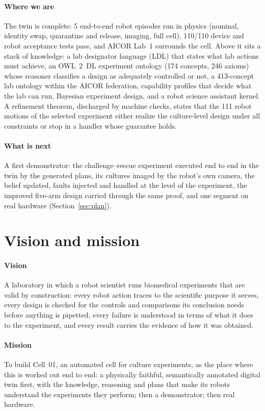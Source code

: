 \documentclass[10.5pt,a4paper]{article}
\begin{document}
\paragraph{Where we are} The twin is complete: 5 end-to-end robot episodes run in physics
(nominal, identity swap, quarantine and release, imaging, full cell), 110/110 device and robot
acceptance tests pass, and AICOR Lab~1 surrounds the cell. Above it sits a stack of knowledge: a lab designator language
(LDL) that states what lab actions must achieve, an OWL~2~DL experiment ontology (174 concepts, 246 axioms) whose reasoner classifies a design as adequately controlled or not, a 413-concept lab ontology within the AICOR federation, capability profiles that decide what the lab can run,
Bayesian experiment design, and a robot science assistant kernel. A refinement theorem, discharged by machine checks,
states that the 111 robot motions of the selected experiment either realize the culture-level
design under all constraints or stop in a handler whose guarantee holds.

\paragraph{What is next} A first demonstrator: the challenge--rescue experiment executed end to end in the twin by the
generated plans, its cultures imaged by the robot's own camera, the belief updated, faults injected and handled at
the level of the experiment, the improved five-arm design carried through the same proof, and one segment on real
hardware (Section~\ref{sec:plan}).


\section{Vision and mission}
\paragraph{Vision} A laboratory in which a robot scientist runs biomedical experiments that are valid by
construction: every robot action traces to the scientific purpose it serves, every design is checked for the controls
and comparisons its conclusion needs before anything is pipetted, every failure is understood in terms of what it
does to the experiment, and every result carries the evidence of how it was obtained.

\paragraph{Mission} To build Cell~01, an automated cell for culture experiments, as the place where this is worked
out end to end: a physically faithful, semantically annotated digital twin first, with the knowledge, reasoning and
plans that make its robots understand the experiments they perform; then a demonstrator; then real hardware.
\end{document}

